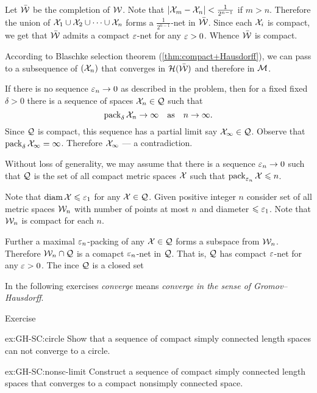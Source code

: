 Let $\bar{\mathcal{W}}$ be the completion of $\mathcal{W}$.
Note that $|\mathcal{X}_m-\mathcal{X}_n|<\tfrac1{2^{n-1}}$ if $m>n$.
Therefore the union of $\mathcal{X}_1\cup \mathcal{X}_2\cup\dots\cup \mathcal{X}_n$ forms a $\tfrac1{2^{n-1}}$-net in $\bar{\mathcal{W}}$.
Since each $\mathcal{X}_i$ is compact, we get that $\bar{\mathcal{W}}$ admits a compact $\varepsilon$-net for any $\varepsilon>0$.
Whence $\bar{\mathcal{W}}$ is compact.

According to Blaschke selection theorem (\ref{thm:compact+Hausdorff}),
we can pass to a subsequence of $(\mathcal{X}_n)$ that converges in $\mathcal{H}(\bar{\mathcal{W}})$ and therefore in $\mathcal{M}$.
\qeds

If there is no sequence $\varepsilon_n\to0$ as described in the problem, then for a fixed fixed $\delta>0$
there is a sequence of spaces $\mathcal{X}_n\in\mathcal{Q}$ such that $$\operatorname{\rm pack}_\delta \mathcal{X}_n\to\infty
\quad\text{as}\quad
n\to\infty.$$
Since $\mathcal{Q}$ is compact, 
this sequence has a partial limit say $\mathcal{X}_\infty\in\mathcal{Q}$.
Observe that $\operatorname{\rm pack}_{\delta} \mathcal{X}_\infty=\infty$.
Therefore $\mathcal{X}_\infty$ --- a contradiction.

Without loss of generality, we may assume that there is a sequence $\varepsilon_n\to 0$ such that 
$\mathcal{Q}$ is the set of all compact metric spaces $\mathcal{X}$ such that
$\operatorname{\rm pack}_{\varepsilon_n} \mathcal{X}\leqslant n$.

Note that $\operatorname{\rm diam}\nolimits \mathcal{X}\leqslant \varepsilon_1$ for any $\mathcal{X}\in \mathcal{Q}$.
Given positive integer $n$ consider set of all metric spaces $\mathcal{W}_n$
with number of points at most $n$ and diameter $\leqslant \varepsilon_1$.
Note that $\mathcal{W}_n$ is compact for each $n$.

Further a maximal $\varepsilon_n$-packing of any $\mathcal{X}\in\mathcal{Q}$ forms a subspace from $\mathcal{W}_n$.
Therefore $\mathcal{W}_n\cap\mathcal{Q}$ is a comapct $\varepsilon_n$-net in  $\mathcal{Q}$.
That is, $\mathcal{Q}$ has compact $\varepsilon$-net for any $\varepsilon>0$.
The ince $\mathcal{Q}$ is a closed set 
\qeds

In the following exercises \emph{converge} means \emph{converge in the sense of Gromov--Hausdorff}.

\begin{thm}{Exercise}\label{ex:GH-SC}
\begin{subthm}{ex:GH-SC:circle}
Show that a sequence of compact simply connected length spaces can not converge to a circle.
\end{subthm}

\begin{subthm}{ex:GH-SC:nonsc-limit}
Construct a sequence of compact simply connected length spaces that converges to a compact nonsimply connected space.
\end{subthm}
\end{thm}


